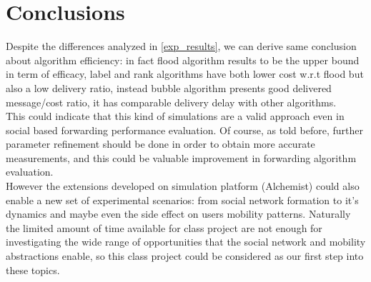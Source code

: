 \section{Conclusions}
\label{conclusions}

Despite the differences analyzed in \ref{exp_results}, we can derive same conclusion about algorithm efficiency: in fact flood algorithm results to be the upper bound in term of efficacy, label and rank algorithms have both lower cost w.r.t flood but also a low delivery ratio, instead bubble algorithm presents good delivered message/cost ratio, it has comparable delivery delay with other algorithms.\\
This could indicate that this kind of simulations are a valid approach even in social based forwarding performance evaluation. Of course, as told before, further parameter refinement should be done in order to obtain more accurate measurements, and this could be valuable improvement in forwarding algorithm evaluation.\\
However the extensions developed on simulation platform (Alchemist) could also enable a new set of experimental scenarios: from social network formation to it's dynamics and maybe even the side effect on users mobility patterns. Naturally the limited amount of time available for class project are not enough for investigating the wide range of opportunities that the social network and mobility abstractions enable, so this class project could be considered as our first step into these topics.  

